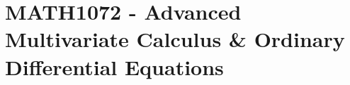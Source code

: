 \hypertarget{MATH1072}{\section{MATH1072 - Advanced Multivariate Calculus \& Ordinary Differential Equations}}
